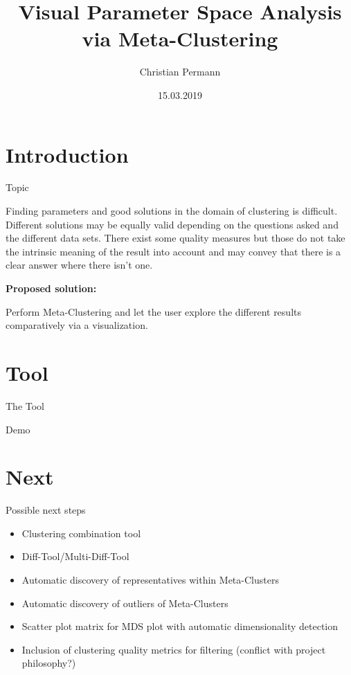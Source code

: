 \documentclass{beamer}
\title[Visual Parameter Space Analysis via Meta-Clustering]{Visual Parameter Space Analysis via Meta-Clustering}
\author{Christian Permann}
\institute{Faculty of Computer Science, University of Vienna,\newline W\"ahringer Stra{\ss}e 29, 1090 Vienna}
\date{15.03.2019}
\begin{document}
\begin{frame}
  \titlepage
\end{frame}


\section{Introduction}

\begin{frame}{Topic}

Finding parameters and good solutions in the domain of clustering is difficult. Different solutions may be equally valid depending on the questions asked and the different data sets. There exist some quality measures but those do not take the intrinsic meaning of the result into account and may convey that there is a clear answer where there isn't one.

\vspace{5mm}
\textbf{Proposed solution:}

Perform Meta-Clustering and let the user explore the different results comparatively via a visualization.

\end{frame}

\section{Tool}

\begin{frame}{The Tool}

\centerline{Demo}

\end{frame}

\section{Next}

\begin{frame}{Possible next steps}

\begin{itemize}
  \item Clustering combination tool
  \item Diff-Tool/Multi-Diff-Tool
  \item Automatic discovery of representatives within Meta-Clusters
  \item Automatic discovery of outliers of Meta-Clusters
  \item Scatter plot matrix for MDS plot with automatic dimensionality detection
  \item Inclusion of clustering quality metrics for filtering (conflict with project philosophy?)
\end{itemize}

\end{frame}

\begin{frame}
  \titlepage
\end{frame}


%

\end{document}
